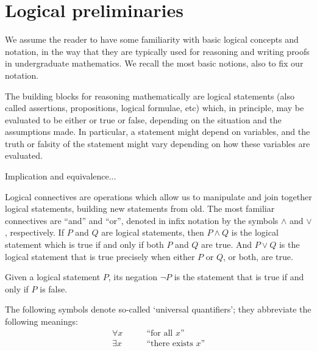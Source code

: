 

\section{Logical preliminaries}

We assume the reader to have some familiarity with basic logical concepts and notation, in the way that they are typically used for reasoning and writing proofs in undergraduate mathematics. We recall the most basic notions, also to fix our notation. 

The building blocks for reasoning mathematically are logical statements (also called assertions, propositions, logical formulae, etc) which, in principle, may be evaluated to be either or true or false, depending on the situation and the assumptions made.  In particular, a statement might depend on variables, and the truth or falsity of the statement might vary depending on how these variables are evaluated. 

Implication and equivalence... 

Logical connectives are operations which allow us to manipulate and join together logical statements, building new statements from old. The most familiar connectives are ``and'' and ``or'', denoted in infix notation by the symbols $\wedge$ and $\vee$, respectively. If $P$ and $Q$ are logical statements, then $P \wedge Q$ is the logical statement which is true if and only if both $P$ and $Q$ are true. And $P \vee Q$ is the logical statement that is true precisely when either $P$ or $Q$, or both, are true. 

Given a logical statement $P$, its negation $\lnot P$ is the statement that is true if and only if $P$ is false. 

The following symbols denote so-called `universal quantifiers'; they abbreviate the following meanings:
\begin{align}
\forall x &\quad \quad \text{``for all $x$''} \\
\exists x &\quad \quad \text{``there exists $x$''}
\end{align}

